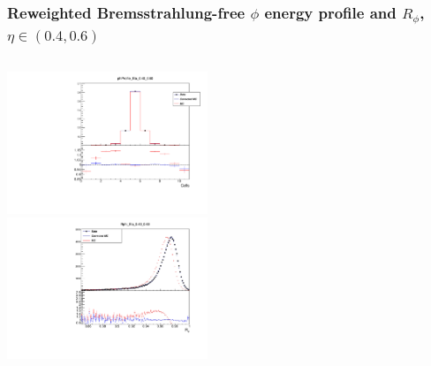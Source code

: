 \documentclass{beamer}
\begin{document}
\begin{frame}
\frametitle{Reweighted Bremsstrahlung-free $\phi$ energy profile and $R_\phi$, $\eta \in (0.4, 0.6)$}

\begin{columns}[t]
\centering
\includegraphics[width=6cm]{phiProfile_Rew_Eta_4_6_Local_Rew_noBS.pdf}\\
\centering
\includegraphics[width=6cm]{Rphi_Rew_Eta_4_6_Local_Rew_noBS.pdf}\\

\end{columns}
\end{frame}
\end{document}
